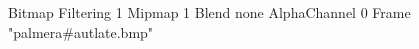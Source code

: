 {Bitmap
	{Filtering 1}
	{Mipmap 1}
	{Blend none}
	{AlphaChannel 0}
	{Frame "palmera#autlate.bmp"}
}
